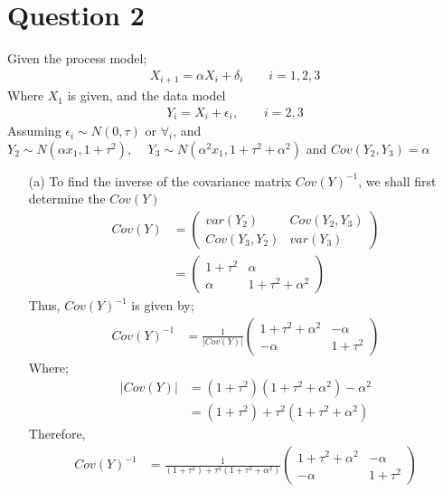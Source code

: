 \documentclass[12pt,a4paper]{article}
\begin{document}
\section*{Question 2}
Given the process model;
\begin{align*}
X_{i+1}=\alpha X_{i}+ \delta_{i} \quad \quad i=1,2,3
\end{align*}
Where $X_{1}$ is given, and the data model
\begin{align*}
Y_{i}=X_{i}+ \epsilon_{i}, \quad \quad i=2,3
\end{align*}
Assuming $\epsilon_{i} \sim N(0,\tau)$ or $\forall_{i}$, and \\
$Y_{2}\sim N(\alpha x_{1},1+\tau ^{2})$, $\quad  Y_{3} \sim N(\alpha^{2}x_{1},1+\tau^{2}+\alpha^{2})$ and $Cov(Y_{2},Y_{3})=\alpha$
\begin{itemize}
	\item [(a)] To find the inverse of the covariance matrix $Cov(Y)^{-1}$, we shall first determine the $Cov(Y)$
	\begin{align*}
	Cov(Y)&=\begin{pmatrix}
	var(Y_{2})&Cov(Y_{2},Y_{3})\\
	Cov(Y_{3},Y_{2})&var(Y_{3})
	\end{pmatrix}\\
	&=\begin{pmatrix}
	1+\tau^{2}&\alpha\\
	\alpha &1+\tau^{2} +\alpha^{2}
	\end{pmatrix}
	\end{align*}
	Thus, $Cov(Y)^{-1}$ is given by;
	\begin{align*}
	Cov(Y)^{-1}&=\frac{1}{\left|Cov(Y)\right|}\begin{pmatrix}
	1+\tau^{2} +\alpha^{2}&-\alpha\\
	-\alpha &1+\tau^{2}
	\end{pmatrix}
	\end{align*}
	Where;
	\begin{align*}
	|Cov(Y)|&=(1+\tau^{2})(1+\tau^{2} + \alpha^{2})-\alpha^{2}\\
	&=(1+\tau^{2} )+\tau^{2}(1+\tau^{2}+\alpha^{2})
	\end{align*}
	Therefore,
	\begin{align*}
		Cov(Y)^{-1}&=\frac{1}{(1+\tau^{2} )+\tau^{2}(1+\tau^{2}+\alpha^{2})}\begin{pmatrix}
		1+\tau^{2} +\alpha^{2}&-\alpha\\
		-\alpha &1+\tau^{2}
		\end{pmatrix}
	\end{align*}
	

\end{itemize}
\end{document}
